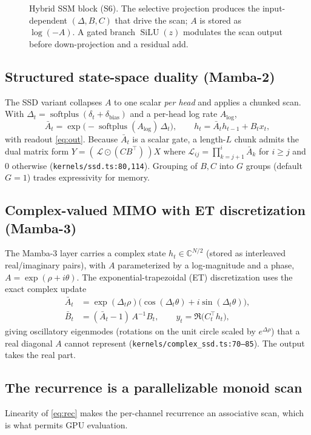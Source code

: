 \documentclass[journal,onecolumn,11pt]{IEEEtran}
\DeclareMathOperator{\softplus}{softplus}
\DeclareMathOperator{\silu}{SiLU}
\newcommand{\Abar}{\bar{A}}
\newcommand{\Bbar}{\bar{B}}
\newcommand{\C}{\mathbb{C}}
\begin{document}
\begin{figure}[t]
\centering

\caption{Hybrid SSM block (S6). The selective projection produces the
input-dependent $(\Delta,B,C)$ that drive the scan; $A$ is stored as $\log(-A)$.
A gated branch $\silu(z)$ modulates the scan output before down-projection and a
residual add.}
\label{fig:block}
\end{figure}

\subsection{Structured state-space duality (Mamba-2)}
The SSD variant collapses $A$ to one scalar \emph{per head} and applies a
chunked scan. With $\Delta_t=\softplus(\delta_t+\delta_{\text{bias}})$ and a
per-head log rate $A_{\log}$,
\begin{equation}
\Abar_t=\exp\!\big(-\softplus(A_{\log})\,\Delta_t\big),\qquad
h_t=\Abar_t h_{t-1}+B_t x_t,
\label{eq:ssd}
\end{equation}
with readout \eqref{eq:out}. Because $\Abar_t$ is a scalar gate, a length-$L$
chunk admits the dual matrix form $Y=(\,\mathcal{L}\odot(C B^{\top})\,)X$ where
$\mathcal{L}_{ij}=\prod_{k=j+1}^{i}\Abar_k$ for $i\ge j$ and $0$ otherwise
(\texttt{kernels/ssd.ts:80,114}). Grouping of $B,C$ into $G$ groups (default
$G{=}1$) trades expressivity for memory.

\subsection{Complex-valued MIMO with ET discretization (Mamba-3)}
The Mamba-3 layer carries a complex state $h_t\in\C^{N/2}$ (stored as
interleaved real/imaginary pairs), with $A$ parameterized by a log-magnitude and
a phase, $A=\exp(\rho+i\theta)$. The exponential-trapezoidal (ET) discretization
uses the exact complex update
\begin{align}
\Abar_t&=\exp(\Delta_t\rho)\big(\cos(\Delta_t\theta)+i\sin(\Delta_t\theta)\big),\\
\Bbar_t&=(\Abar_t-1)\,A^{-1}B_t,\qquad y_t=\Re\!\big(C_t^{\top}h_t\big),
\label{eq:complex}
\end{align}
giving oscillatory eigenmodes (rotations on the unit circle scaled by
$e^{\Delta\rho}$) that a real diagonal $A$ cannot represent
(\texttt{kernels/complex\_ssd.ts:70--85}). The output takes the real part.

\subsection{The recurrence is a parallelizable monoid scan}
Linearity of \eqref{eq:rec} makes the per-channel recurrence an associative
scan, which is what permits GPU evaluation.
\end{document}

